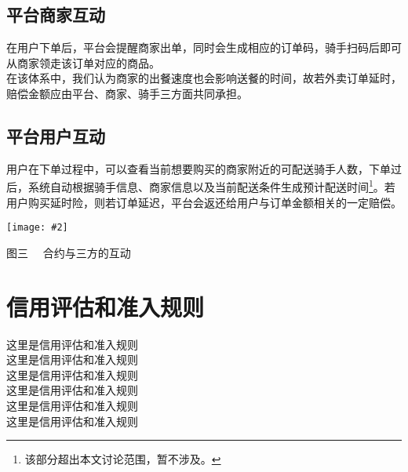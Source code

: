 \documentclass[UTF8]{ctexart}
\newcommand\picturehere[2][1]{\centerline{\texttt{[image: \#2]}}}
\newcommand\picfig[1]{\centerline{\small \heiti #1 \songti }}
\begin{document}
\begin{multicols}{2}
  \subsection{平台商家互动}
  \indent 在用户下单后，平台会提醒商家出单，同时会生成相应的订单码，骑手扫码后即可从商家领走该订单对应的商品。\\
  \indent 在该体系中，我们认为商家的出餐速度也会影响送餐的时间，故若外卖订单延时，赔偿金额应由平台、商家、骑手三方面共同承担。
  \subsection{平台用户互动}
  \indent 用户在下单过程中，可以查看当前想要购买的商家附近的可配送骑手人数，下单过后，系统自动根据骑手信息、商家信息以及当前配送条件生成预计配送时间\footnote{该部分超出本文讨论范围，暂不涉及。}。若用户购买延时险，则若订单延迟，平台会返还给用户与订单金额相关的一定赔偿。
  \picturehere[0.5]{image/contract.png}
  \picfig{图三 \ \ 合约与三方的互动}



  \section{信用评估和准入规则}
  这里是信用评估和准入规则\\
  这里是信用评估和准入规则\\
  这里是信用评估和准入规则\\
  这里是信用评估和准入规则\\
  这里是信用评估和准入规则\\
  这里是信用评估和准入规则
\end{multicols}




\end{document}
